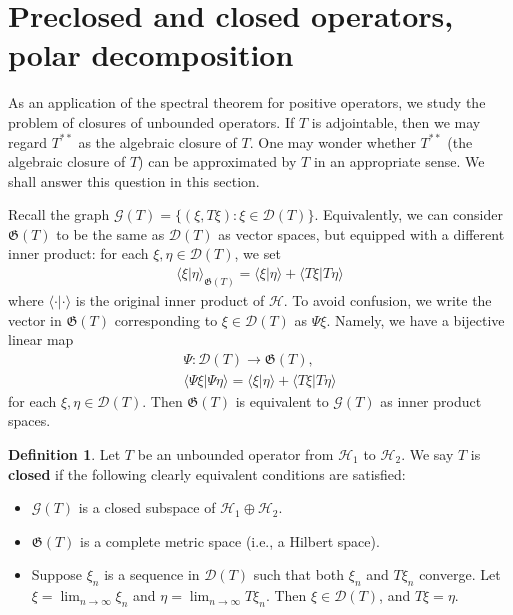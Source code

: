 \documentclass[12pt,a4paper,notitlepage]{article}
\theoremstyle{definition}
\newtheorem{df}{Definition}[section]
\theoremstyle{plain}
\newcommand{\fk}{\mathfrak}
\newcommand{\mc}{\mathcal}
\newcommand{\Dom}{\scr D}
\newcommand{\bk}[1]{\langle {#1}\rangle}
\newcommand{\scr}{\mathscr}
\numberwithin{equation}{section}
\begin{document}
\section{Preclosed and closed operators, polar decomposition}

As an application of the spectral theorem for positive operators, we study the problem of closures of unbounded operators. If $T$ is adjointable, then we may regard $T^{**}$ as the algebraic closure of $T$. One may wonder whether $T^{**}$ (the algebraic closure of $T$) can be approximated by $T$ in an appropriate sense. We shall answer this question in this section.

Recall the graph $\scr G(T)=\{(\xi,T\xi):\xi\in\Dom(T)\}$. Equivalently, we can consider $\fk G(T)$ \index{GT@$\scr G(T),\fk G(T)$} to be the same as $\Dom(T)$ as vector spaces, but equipped with a different inner product: for each $\xi,\eta\in\Dom(T)$, we set
\begin{align}
\bk{\xi|\eta}_{\fk G(T)}=\bk{\xi|\eta}+\bk{T\xi|T\eta}\label{eq11}
\end{align}
where $\bk {\cdot|\cdot}$ is the original inner product of $\mc H$. To avoid confusion, we write the vector in $\fk G(T)$ corresponding to $\xi\in\Dom(T)$ as $\Psi\xi$. Namely, we have a bijective linear map
\begin{gather}
\Psi:\Dom(T)\rightarrow\fk G(T),\nonumber\\
\bk{\Psi\xi|\Psi\eta}=\bk{\xi|\eta}+\bk{T\xi|T\eta}	\label{eq7}
\end{gather}
for each $\xi,\eta\in\Dom(T)$. Then $\fk G(T)$ is equivalent to $\scr G(T)$ as inner product spaces.



\begin{df}
Let $T$ be an unbounded operator from $\mc H_1$ to $\mc H_2$. We say $T$ is \textbf{closed} if the following clearly equivalent conditions are satisfied:
\begin{itemize}
\item $\scr G(T)$ is a closed subspace of $\mc H_1\oplus\mc H_2$.
\item $\fk G(T)$ is a complete metric space (i.e., a Hilbert space).
\item Suppose $\xi_n$ is a sequence in $\Dom(T)$ such that both $\xi_n$ and $T\xi_n$ converge. Let $\xi=\lim_{n\rightarrow\infty}\xi_n$ and $\eta=\lim_{n\rightarrow\infty}T\xi_n$. Then $\xi\in\Dom(T)$, and $T\xi=\eta$.
\end{itemize}
\end{df}
\end{document}

